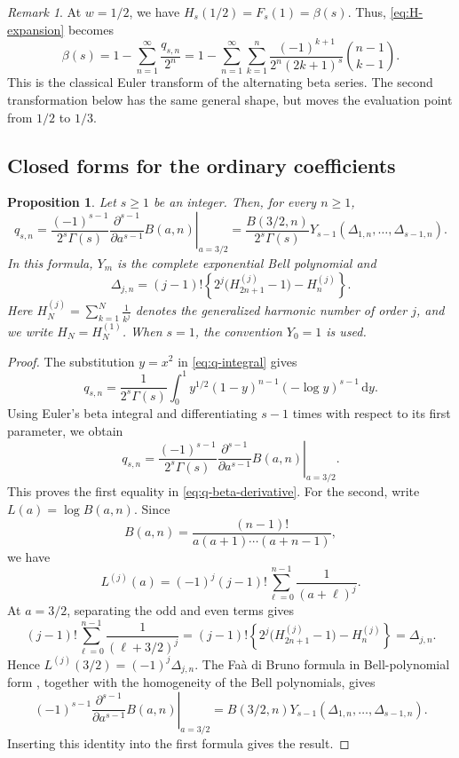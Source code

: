 \documentclass[11pt,reqno]{amsart}
\numberwithin{equation}{section}
\newtheorem{proposition}[theorem]{Proposition}
\theoremstyle{definition}
\theoremstyle{remark}
\newtheorem{remark}[theorem]{Remark}
\newcommand{\dd}{\,\mathrm{d}}
\begin{document}
\begin{remark}\label{rem:euler-beta}
At \(w=1/2\), we have
\(H_s(1/2)=F_s(1)=\beta(s)\).  Thus, \eqref{eq:H-expansion} becomes
\[
 \beta(s)
 =
 1-\sum_{n=1}^{\infty}\frac{q_{s,n}}{2^n}=1-\sum_{n=1}^{\infty}\sum_{k=1}^{n}
 \frac{(-1)^{k+1}}{2^n(2k+1)^s}
 \binom{n-1}{k-1}.
\]
This is the classical Euler transform of the alternating beta series.
The second transformation below has the same general shape, but moves
the evaluation point from \(1/2\) to \(1/3\).
\end{remark}

\subsection{Closed forms for the ordinary coefficients}

\begin{proposition}\label{prop:q-beta}
Let \(s\geq1\) be an integer.  Then, for every \(n\geq1\),
\begin{equation}\label{eq:q-beta-derivative}
 q_{s,n}
 =\frac{(-1)^{s-1}}{2^s\Gamma(s)}
 \left.
 \frac{\partial^{s-1}}{\partial a^{s-1}}B(a,n)
 \right|_{a=3/2}=\frac{B(3/2,n)}{2^s\Gamma(s)}
 Y_{s-1}(\Delta_{1,n},\ldots,\Delta_{s-1,n}).
\end{equation}
In this formula, \(Y_m\) is the complete exponential Bell polynomial
and
\begin{equation}\label{eq:Dj}
 \Delta_{j,n}=(j-1)!
 \left\{2^j\bigl(H_{2n+1}^{(j)}-1\bigr)-H_n^{(j)}\right\}.
\end{equation}
Here
\(
 H_N^{(j)}=\sum_{k=1}^{N}\frac1{k^j}
\)
denotes the generalized harmonic number of order \(j\), and we write
\(H_N=H_N^{(1)}\).  When \(s=1\), the convention \(Y_0=1\) is used.
\end{proposition}

\begin{proof}
The substitution \(y=x^2\) in \eqref{eq:q-integral} gives
\[
 q_{s,n}
 =
 \frac1{2^s\Gamma(s)}
 \int_0^1y^{1/2}(1-y)^{n-1}
 (-\log y)^{s-1}\dd y.
\]
Using Euler's beta integral
\cite[Eq.~(1.1.12)]{AndrewsAskeyRoy1999}
and differentiating \(s-1\) times with respect to its first parameter,
we obtain
\[
 q_{s,n}
 =
 \frac{(-1)^{s-1}}{2^s\Gamma(s)}
 \left.
 \frac{\partial^{s-1}}{\partial a^{s-1}}B(a,n)
 \right|_{a=3/2}.
\]
This proves the first equality in
\eqref{eq:q-beta-derivative}.  For the second, write
\(
 L(a)=\log B(a,n).
\)
Since
\[
 B(a,n)
 =
 \frac{(n-1)!}{a(a+1)\cdots(a+n-1)},
\]
we have
\[
 L^{(j)}(a)
 =
 (-1)^j(j-1)!
 \sum_{\ell=0}^{n-1}\frac1{(a+\ell)^j}.
\]
At \(a=3/2\), separating the odd and even terms gives
\[
 (j-1)!
 \sum_{\ell=0}^{n-1}\frac1{(\ell+3/2)^j}
 =
 (j-1)!
 \left\{
 2^j\bigl(H_{2n+1}^{(j)}-1\bigr)-H_n^{(j)}
 \right\}
 =\Delta_{j,n}.
\]
Hence
\(L^{(j)}(3/2)=(-1)^j\Delta_{j,n}\).  The Fa\`a di Bruno formula in Bell-polynomial form
\cite[Ch.~III, Thm.~C]{Comtet1974}, together with the homogeneity of
the Bell polynomials, gives
\[
 (-1)^{s-1}
 \left.
 \frac{\partial^{s-1}}{\partial a^{s-1}}B(a,n)
 \right|_{a=3/2}
 =
 B(3/2,n)
 Y_{s-1}(\Delta_{1,n},\ldots,\Delta_{s-1,n}).
\]
Inserting this identity into the first formula gives the result.
\end{proof}
\end{document}

